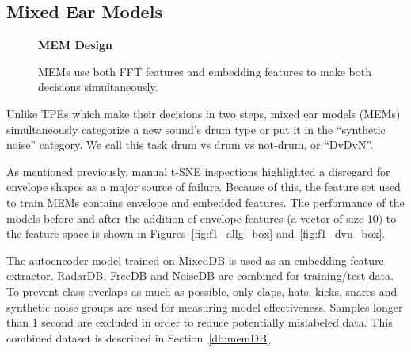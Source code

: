 \documentclass[\main/thesis.tex]{subfiles}
\begin{document}



\subsection{Mixed Ear Models}
\label{chap3:mixed_ear_models}
\begin{figure}[t!]
    \begin{center}
    \textbf{MEM Design}
    \end{center}
    \caption{MEMs use both FFT features and embedding features to make both decisions simultaneously. }
\label{fig:TPE_design}
\end{figure}

Unlike TPEs which make their decisions in two steps, mixed ear models (MEMs) simultaneously categorize a new sound's drum type or put it in the \enquote{synthetic noise} category. We call this task drum vs drum vs not-drum, or \enquote{DvDvN}.

As mentioned previously, manual t-SNE inspections highlighted a disregard for envelope shapes as a major source of failure. Because of this, the feature set used to train MEMs contains envelope and embedded features. The performance of the models before and after the addition of envelope features (a vector of size 10) to the feature space is shown in Figures~\ref{fig:f1_allg_box} and~\ref{fig:f1_dvn_box}.

The autoencoder model trained on MixedDB is used as an embedding feature extractor. RadarDB, FreeDB and NoiseDB are combined for training/test data. To prevent class overlaps as much as possible, only claps, hats, kicks, snares and synthetic noise groups are used for measuring model effectiveness. Samples longer than 1 second are excluded in order to reduce potentially mislabeled data. This combined dataset is described in Section~\ref{db:memDB}
\end{document}
